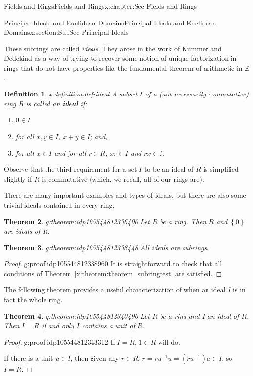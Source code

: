 \documentclass[oneside,10pt,]{book}
\newcommand{\xreffont}{\relax}
\newcommand{\terminology}[1]{\textbf{#1}}
\numberwithin{equation}{section}
\newcommand{\set}[1]{\left\{ {#1} \right\}}
\def\Z{{\mathbb Z}}
\newtheorem{theorem}{Theorem}[section]
\newtheorem{definition}[theorem]{Definition}
\begin{document}
\begin{chapterptx}{Fields and Rings}{}{Fields and Rings}{}{}{x:chapter:Sec-Fields-and-Rings}
\begin{sectionptx}{Principal Ideals and Euclidean Domains}{}{Principal Ideals and Euclidean Domains}{}{}{x:section:SubSec-Principal-Ideals}
\par
These subrings are called \emph{ideals}. They arose in the work of Kummer and Dedekind as a way of trying to recover some notion of unique factorization in rings that do not have properties like the fundamental theorem of arithmetic in \(\Z\).%
\begin{definition}{}{x:definition:def-ideal}%
A subset \(I\) of a (not necessarily commutative) ring \(R\) is called an \terminology{ideal} if:%
\begin{enumerate}
\item{}\(\displaystyle 0\in I\)%
\item{}for all \(x,y\in I\), \(x+y\in I\); and,%
\item{}for all \(x\in I\) and for all \(r\in R\), \(xr\in I\) and \(rx\in I\).%
\end{enumerate}
%
\end{definition}
Observe that the third requirement for a set \(I\) to be an ideal of \(R\) is simplified slightly if \(R\) is commutative (which, we recall, all of our rings are).%
\par
There are many important examples and types of ideals, but there are also some trivial ideals contained in every ring.%
\begin{theorem}{}{}{g:theorem:idp105544812336400}%
Let \(R\) be a ring. Then \(R\) and \(\set{0}\) are ideals of \(R\).%
\end{theorem}
\begin{theorem}{}{}{g:theorem:idp105544812338448}%
All ideals are subrings.%
\end{theorem}
\begin{proof}{}{g:proof:idp105544812338960}
It is straightforward to check that all conditions of \hyperref[x:theorem:theorem_subringtest]{Theorem~{\xreffont\ref{x:theorem:theorem_subringtest}}} are satisfied.%
\end{proof}
The following theorem provides a useful characterization of when an ideal \(I\) is in fact the whole ring.%
\begin{theorem}{}{}{g:theorem:idp105544812340496}%
Let \(R\) be a ring and \(I\) an ideal of \(R\). Then \(I = R\) if and only \(I\) contains a unit of \(R\).%
\end{theorem}
\begin{proof}{}{g:proof:idp105544812343312}
If \(I = R\), \(1\in R\) will do.%
\par
If there is a unit \(u\in I\), then given any \(r\in R\), \(r = r u^{-1} u = (ru^{-1}) u \in I\), so \(I = R\).%
\end{proof}

\end{sectionptx}
\end{chapterptx}
\end{document}
